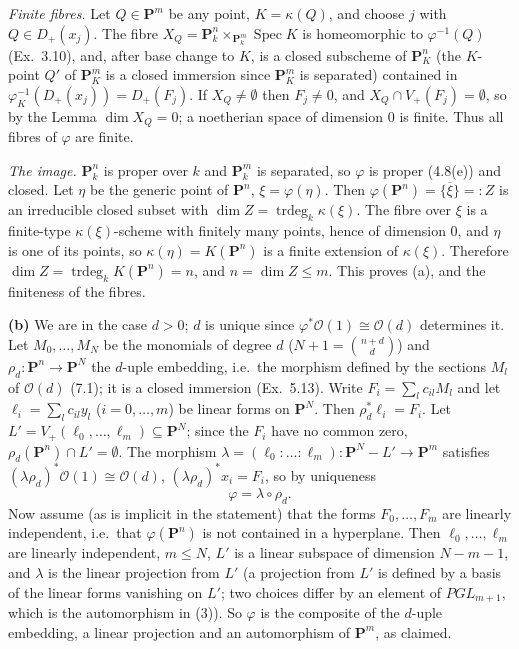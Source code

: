 \documentclass[11pt]{article}
\begin{document}
\emph{Finite fibres.} Let $Q\in\mathbf P^m$ be any point, $K=\kappa(Q)$, and choose $j$ with $Q\in D_+(x_j)$. The fibre $X_Q=\mathbf P^n_k\times_{\mathbf P^m_k}\operatorname{Spec}K$ is homeomorphic to $\varphi^{-1}(Q)$ (Ex.~3.10), and, after base change to $K$, is a closed subscheme of $\mathbf P^n_K$ (the $K$-point $Q'$ of $\mathbf P^m_K$ is a closed immersion since $\mathbf P^m_K$ is separated) contained in $\varphi_K^{-1}(D_+(x_j))=D_+(F_j)$. If $X_Q\ne\emptyset$ then $F_j\neq0$, and $X_Q\cap V_+(F_j)=\emptyset$, so by the Lemma $\dim X_Q=0$; a noetherian space of dimension $0$ is finite. Thus all fibres of $\varphi$ are finite.

\emph{The image.} $\mathbf P^n_k$ is proper over $k$ and $\mathbf P^m_k$ is separated, so $\varphi$ is proper (4.8(e)) and closed. Let $\eta$ be the generic point of $\mathbf P^n$, $\xi=\varphi(\eta)$. Then $\varphi(\mathbf P^n)=\overline{\{\xi\}}=:Z$ is an irreducible closed subset with $\dim Z=\operatorname{trdeg}_k\kappa(\xi)$. The fibre over $\xi$ is a finite-type $\kappa(\xi)$-scheme with finitely many points, hence of dimension $0$, and $\eta$ is one of its points, so $\kappa(\eta)=K(\mathbf P^n)$ is a finite extension of $\kappa(\xi)$. Therefore $\dim Z=\operatorname{trdeg}_kK(\mathbf P^n)=n$, and $n=\dim Z\le m$. This proves (a), and the finiteness of the fibres.

\textbf{(b)} We are in the case $d>0$; $d$ is unique since $\varphi^*\mathcal O(1)\cong\mathcal O(d)$ determines it. Let $M_0,\dots,M_N$ be the monomials of degree $d$ ($N+1=\binom{n+d}{d}$) and $\rho_d:\mathbf P^n\to\mathbf P^N$ the $d$-uple embedding, i.e.\ the morphism defined by the sections $M_l$ of $\mathcal O(d)$ (7.1); it is a closed immersion (Ex.~5.13). Write $F_i=\sum_lc_{il}M_l$ and let $\ell_i=\sum_lc_{il}y_l$ ($i=0,\dots,m$) be linear forms on $\mathbf P^N$. Then $\rho_d^*\ell_i=F_i$. Let $L'=V_+(\ell_0,\dots,\ell_m)\subseteq\mathbf P^N$; since the $F_i$ have no common zero, $\rho_d(\mathbf P^n)\cap L'=\emptyset$. The morphism $\lambda=(\ell_0:\dots:\ell_m):\mathbf P^N-L'\to\mathbf P^m$ satisfies $(\lambda\rho_d)^*\mathcal O(1)\cong\mathcal O(d)$, $(\lambda\rho_d)^*x_i=F_i$, so by uniqueness
\[
\varphi=\lambda\circ\rho_d .
\]
Now assume (as is implicit in the statement) that the forms $F_0,\dots,F_m$ are linearly independent, i.e.\ that $\varphi(\mathbf P^n)$ is not contained in a hyperplane. Then $\ell_0,\dots,\ell_m$ are linearly independent, $m\le N$, $L'$ is a linear subspace of dimension $N-m-1$, and $\lambda$ is the linear projection from $L'$ (a projection from $L'$ is defined by a basis of the linear forms vanishing on $L'$; two choices differ by an element of $PGL_{m+1}$, which is the automorphism in (3)). So $\varphi$ is the composite of the $d$-uple embedding, a linear projection and an automorphism of $\mathbf P^m$, as claimed.
\end{document}
